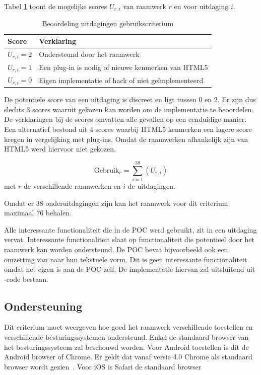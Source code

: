 Tabel \ref{tabel:scores-uitdagingen} toont de mogelijke scores $U_{r,i}$ van raamwerk $r$ en voor uitdaging $i$.
\begin{table}[h]	
  \centering
  \begin{tabular}{ll}
    \toprule
    \textbf{Score} & \textbf{Verklaring}\\
    \midrule
    $U_{r,i} = 2$ & Ondersteund door het raamwerk\\
    $U_{r,i} = 1$ & Een plug-in is nodig of nieuwe kenmerken van HTML5\\
    $U_{r,i} = 0$ & Eigen implementatie of hack of niet geïmplementeerd\\ 
    \bottomrule
  \end{tabular}
  \caption{Beoordeling uitdagingen gebruikscriterium}
  \label{tabel:scores-uitdagingen}
\end{table}

De potentiele score van een uitdaging is discreet en ligt tussen $0$ en $2$.
Er zijn dus slechts $3$ scores waaruit gekozen kan worden om de implementatie te beoordelen.
De verklaringen bij de scores omvatten alle gevallen op een eenduidige manier.
Een alternatief bestond uit $4$ scores waarbij HTML5 kenmerken een lagere score kregen in vergelijking met plug-ins.
Omdat de raamwerken afhankelijk zijn van HTML5 werd hiervoor niet gekozen.

\begin{equation}
  \text{Gebruik}_r = \sum_{i=1}^{38}{\left(U_{r,i}\right)}
  \label{eq:gebruik}
\end{equation}
met $r$ de verschillende raamwerken en $i$ de uitdagingen.

Omdat er $38$ onderuitdagingen zijn kan het raamwerk voor dit criterium maximaal $76$ behalen.

Alle interessante functionaliteit die in de POC werd gebruikt, zit in een uitdaging vervat.  
Interessante functionaliteit slaat op functionaliteit die potentieel door het raamwerk kan worden ondersteund.
De POC bevat bijvoorbeeld ook een omzetting van  naar hun tekstuele vorm.
Dit is geen interessante functionaliteit omdat het eigen is aan de POC zelf.
De implementatie hiervan zal uitsluitend uit  \js{}-code bestaan.


\subsection{Ondersteuning}
\label{sec:vergelijking-ondersteuning}
Dit criterium moet weergeven hoe goed het raamwerk verschillende toestellen en verschillende besturingssystemen ondersteund.
Enkel de standaard browser van het besturingssysteem zal beschouwd worden.
Voor Android toestellen is dit de Android browser of Chrome.  
Er geldt dat vanaf versie 4.0 Chrome als standaard browser wordt gezien~\cite{Wimberly2008}.
Voor iOS is Safari de standaard browser


